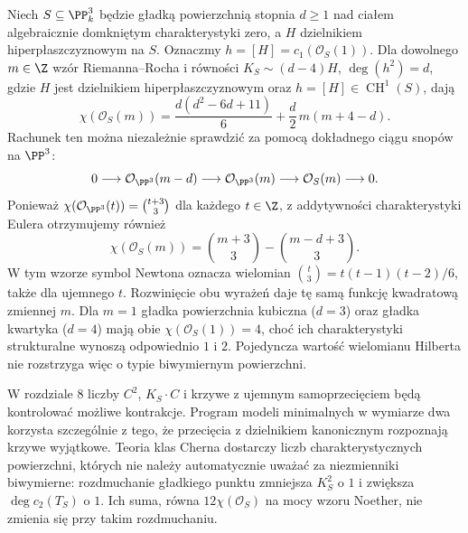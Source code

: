 \begin{przyklad}
\label{prz:ga7-hilbert-polynomial}
Niech $S\subseteq\PP^3_k$ będzie gładką powierzchnią
stopnia $d\ge1$ nad ciałem algebraicznie domkniętym
charakterystyki zero, a $H$ dzielnikiem hiperpłaszczyznowym
na $S$. Oznaczmy $h=[H]=c_1(\mathcal O_S(1))$.
Dla dowolnego $m\in\Z$ wzór Riemanna--Rocha
i równości $K_S\sim(d-4)H$, $\deg(h^2)=d$,
gdzie $H$ jest dzielnikiem hiperpłaszczyznowym
oraz $h=[H]\in\operatorname{CH}^1(S)$, dają
\[
\chi(\mathcal O_S(m))
=\frac{d(d^2-6d+11)}6
 +\frac d2\,m(m+4-d).
\]
Rachunek ten można niezależnie sprawdzić za pomocą
dokładnego ciągu snopów na $\PP^3$:
\[
0\longrightarrow\mathcal O_{\PP^3}(m-d)
\longrightarrow\mathcal O_{\PP^3}(m)
\longrightarrow\mathcal O_S(m)\longrightarrow0.
\]
Ponieważ
$\chi(\mathcal O_{\PP^3}(t))=\binom{t+3}{3}$
dla każdego $t\in\Z$, z addytywności charakterystyki
Eulera otrzymujemy również
\[
\chi(\mathcal O_S(m))
=\binom{m+3}{3}-\binom{m-d+3}{3}.
\]
W tym wzorze symbol Newtona oznacza wielomian
$\binom{t}{3}=t(t-1)(t-2)/6$, także dla ujemnego
$t$. Rozwinięcie obu wyrażeń daje tę samą funkcję
kwadratową zmiennej $m$. Dla $m=1$ gładka
powierzchnia kubiczna ($d=3$) oraz gładka kwartyka
($d=4$) mają obie $\chi(\mathcal O_S(1))=4$,
choć ich charakterystyki strukturalne wynoszą
odpowiednio $1$ i $2$. Pojedyncza wartość
wielomianu Hilberta nie rozstrzyga więc o typie
biwymiernym powierzchni.
\end{przyklad}

\begin{uwaga}
W rozdziale 8 liczby $C^2$, $K_S\cdot C$ i krzywe
z ujemnym samoprzecięciem będą kontrolować możliwe
kontrakcje. Program modeli minimalnych w wymiarze dwa
korzysta szczególnie z tego, że przecięcia z dzielnikiem
kanonicznym rozpoznają krzywe wyjątkowe. Teoria
klas Cherna dostarczy liczb charakterystycznych powierzchni,
których nie należy automatycznie uważać za niezmienniki
biwymierne: rozdmuchanie gładkiego punktu zmniejsza $K_S^2$
o $1$ i zwiększa $\deg c_2(T_S)$ o $1$.
Ich suma, równa $12\chi(\mathcal O_S)$ na mocy wzoru Noether,
nie zmienia się przy takim rozdmuchaniu.
\end{uwaga}


